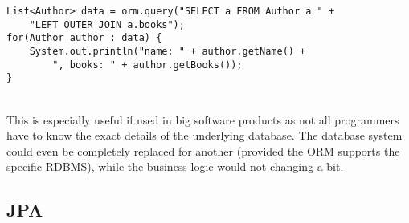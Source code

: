 \lstset{language=java}
\begin{lstlisting}[frame=htrbl, caption={ORM query example}, label={lst:flattening.sql}]
List<Author> data = orm.query("SELECT a FROM Author a " +
	"LEFT OUTER JOIN a.books");
for(Author author : data) {
	System.out.println("name: " + author.getName() + 
		", books: " + author.getBooks());
}
\end{lstlisting}
~\\
This is especially useful if used in big software products as not all programmers have to know the exact details of the underlying database. The database system could even be completely replaced for another (provided the ORM supports the specific RDBMS), while the business logic would not changing a bit.

\subsection{JPA}

